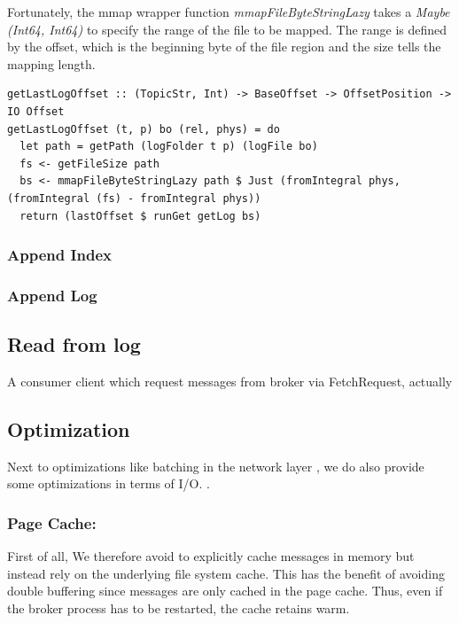 Fortunately, the mmap wrapper function \textit{mmapFileByteStringLazy} takes a
\textit{Maybe (Int64, Int64)} to specify the range of the file to be mapped.
The range is defined by the offset, which is the beginning byte of the file
region and the size tells the mapping length.

\begin{lstlisting}
getLastLogOffset :: (TopicStr, Int) -> BaseOffset -> OffsetPosition -> IO Offset
getLastLogOffset (t, p) bo (rel, phys) = do
  let path = getPath (logFolder t p) (logFile bo)
  fs <- getFileSize path
  bs <- mmapFileByteStringLazy path $ Just (fromIntegral phys, (fromIntegral (fs) - fromIntegral phys))
  return (lastOffset $ runGet getLog bs)
\end{lstlisting}

\subsubsection{Append Index}

\subsubsection{Append Log}


\subsection{Read from log}
A consumer client which request messages from broker via FetchRequest, actually

\subsection{Optimization}

Next to optimizations like batching in the network layer ,
we do also provide some optimizations in terms of I/O. .

\subsubsection{Page Cache:}

First of all, We therefore avoid to explicitly cache messages in memory but
instead rely on the underlying file system cache. This has the benefit of
avoiding double buffering since messages are only cached in the page cache.
Thus, even if the broker process has to be restarted, the cache retains warm.

